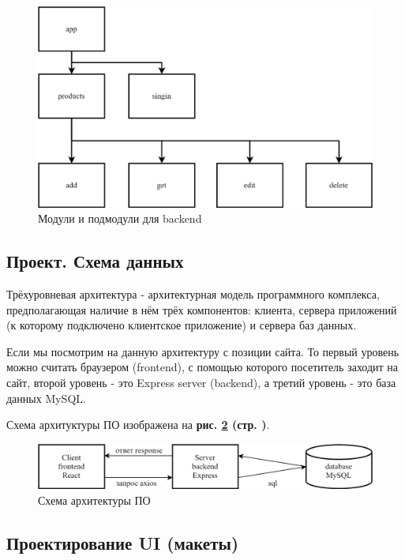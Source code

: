 \begin{figure}[!htp]
    \centering
    \includegraphics[width=12cm]
        {_assets/gpi_backend_modules.png}
    \caption{Модули и подмодули для backend}
    \label{fig:gpi_backend_modules}
\end{figure}

\subsection{Проект. Схема данных}

Трёхуровневая архитектура - архитектурная модель программного комплекса,
предполагающая наличие в нём трёх компонентов: клиента, сервера приложений
(к которому подключено клиентское приложение) и сервера баз данных.

Если мы посмотрим на данную архитектуру с позиции сайта.
То первый уровень можно считать браузером (frontend), с помощью которого посетитель заходит на сайт,
второй уровень - это Express server (backend), а третий уровень - это база данных MySQL.

Схема архитуктуры ПО изображена на
\textbf{рис. \ref{fig:gpi_client_server} (стр. \pageref{fig:gpi_client_server})}.

\begin{figure}[!htp]
    \centering
    \includegraphics[width=16cm]
        {_assets/gpi_client_server.png}
    \caption{Схема архитектуры ПО}
    \label{fig:gpi_client_server}
\end{figure}

\subsection{Проектирование UI (макеты)}

